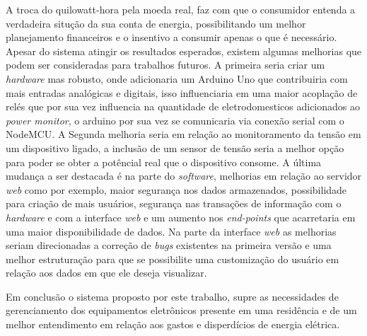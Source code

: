A troca do quilowatt-hora pela moeda real, faz com que o consumidor entenda a verdadeira situção da sua conta de energia, possibilitando um melhor planejamento
financeiros e o insentivo a consumir apenas o que é necessário. Apesar do sistema atingir os resultados esperados, existem algumas melhorias 
que podem ser consideradas para trabalhos futuros. A primeira seria criar um \textit{hardware} mas robusto, onde adicionaria um Arduino Uno
que contribuiria com mais entradas analógicas e digitais, isso influenciaria em uma maior acoplação de relés que por sua vez
influencia na quantidade de eletrodomesticos adicionados ao \textit{power monitor}, o arduino por sua vez se comunicaria via conexão serial 
com o NodeMCU. A Segunda melhoria seria em relação ao monitoramento da tensão em um dispositivo ligado, a inclusão de um sensor de tensão 
seria a melhor opção para poder se obter a potêncial real que o dispositivo consome. A última mudança a ser destacada é na parte do 
\textit{software}, melhorias em relação ao servidor \textit{web} como por exemplo, maior segurança nos dados armazenados, possibilidade para criação
de mais usuários, segurança nas transações de informação com o \textit{hardware} e com a interface \textit{web} e um aumento nos \textit{end-points}
que acarretaria em uma maior disponibilidade de dados. Na parte da interface \textit{web} as melhorias seriam direcionadas a correção de \textit{bugs} 
existentes na primeira versão e uma melhor estruturação para que se possibilite uma customização do usuário em relação aos dados em que ele deseja visualizar.

Em conclusão o sistema proposto por este trabalho, supre as necessidades de gerenciamento dos equipamentos eletrônicos
presente em uma residência e de um melhor entendimento em relação aos gastos e disperdícios de energia elétrica.
